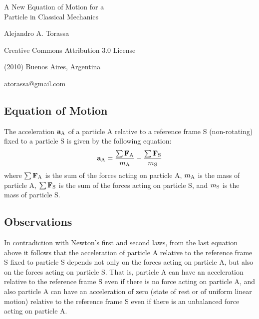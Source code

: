 \documentclass[12pt]{article}
\newcommand{\mm}{m}
\newcommand{\vA}{\mathbf{a}}
\newcommand{\vF}{\mathbf{F}}
\newcommand{\ra}{_{\mbox {\scriptsize A}}}
\newcommand{\rs}{_{\mbox {\scriptsize S}}}
\begin{document}
\begin{center}

{\Large A New Equation of Motion for a \\ Particle in Classical Mechanics}

\bigskip \medskip

{\normalsize Alejandro A. Torassa}

\bigskip \medskip

\scriptsize

Creative Commons Attribution 3.0 License

(2010) Buenos Aires, Argentina

atorassa@gmail.com

\medskip

\end{center}

\begin{abstract}
\noindent This work presents a new equation of motion for a particle in classical mechanics, which can be applied in any non-rotating reference frame (inertial or non-inertial) without the necessity of introducing fictitious forces.
\end{abstract}

\normalsize

{\centering\subsection*{Equation of Motion}}

\par The acceleration $\vA\ra$ of a particle A relative to a reference frame S (non-rotating) fixed to a particle S is given by the following equation:
\begin{eqnarray*}
\vA\ra = \frac{\sum \vF\ra}{\mm\ra} - \frac{\sum \vF\rs}{\mm\rs}
\end{eqnarray*}
\noindent where $\sum \vF\ra$ is the sum of the forces acting on particle A, $\mm\ra$ is the mass of particle A, $\sum \vF\rs$ is the sum of the forces acting on particle S, and $\mm\rs$ is the mass of particle S.

\newpage \enlargethispage{+0.09em}

{\centering\subsection*{Observations}}

\par In contradiction with Newton's first and second laws, from the last equation above it follows that the acceleration of particle A relative to the reference frame S fixed to particle S depends not only on the forces acting on particle A, but also on the forces acting on particle S. That is, particle A can have an acceleration relative to the reference frame S even if there is no force acting on particle A, and also particle A can have an acceleration of zero (state of rest or of uniform linear motion) relative to the reference frame S even if there is an unbalanced force acting on particle A.
\end{document}
